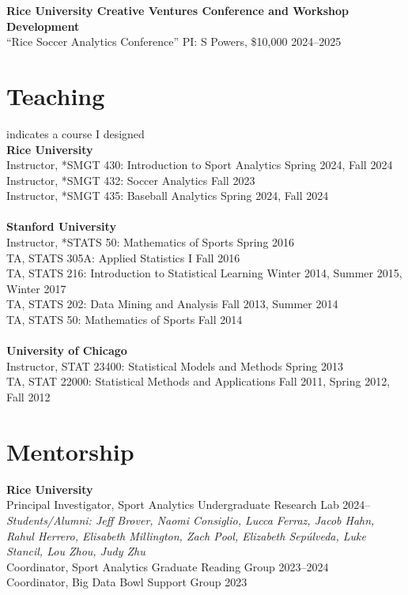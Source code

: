 \documentclass{article}
\begin{document}
{\bf Rice University Creative Ventures Conference and Workshop Development}\\
``Rice Soccer Analytics Conference'' PI: S Powers, \$10,000 \hfill 2024--2025


\section*{\sc Teaching}

\vspace{-4mm}\hfill * indicates a course I designed\\
{\bf Rice University}\\
Instructor, *SMGT 430: Introduction to Sport Analytics \hfill Spring 2024, Fall 2024\\
Instructor, *SMGT 432: Soccer Analytics \hfill Fall 2023\\
Instructor, *SMGT 435: Baseball Analytics \hfill Spring 2024, Fall 2024\\
~\\
{\bf Stanford University}\\
Instructor, *STATS 50: Mathematics of Sports \hspace{5mm} \hfill Spring 2016\\
TA, STATS 305A: Applied Statistics I \hfill Fall 2016\\
TA, STATS 216: Introduction to Statistical Learning \hfill Winter 2014, Summer 2015, Winter 2017\\
TA, STATS 202: Data Mining and Analysis \hfill Fall 2013, Summer 2014\\
TA, STATS 50: Mathematics of Sports \hfill Fall 2014\\
~\\
{\bf University of Chicago}\\
Instructor, STAT 23400: Statistical Models and Methods \hfill Spring 2013\\
TA, STAT 22000: Statistical Methods and Applications \hfill Fall 2011, Spring 2012, Fall 2012


\section*{\sc Mentorship}

{\bf Rice University}\\
Principal Investigator, Sport Analytics Undergraduate Research Lab \hfill 2024--\\
{\it Students/Alumni: Jeff Brover, Naomi Consiglio, Lucca Ferraz, Jacob Hahn, Rahul Herrero, Elisabeth Millington, Zach Pool, Elizabeth Sep\'ulveda, Luke Stancil, Lou Zhou, Judy Zhu}\\
Coordinator, Sport Analytics Graduate Reading Group \hfill 2023--2024\\
Coordinator, Big Data Bowl Support Group \hfill 2023
\end{document}

